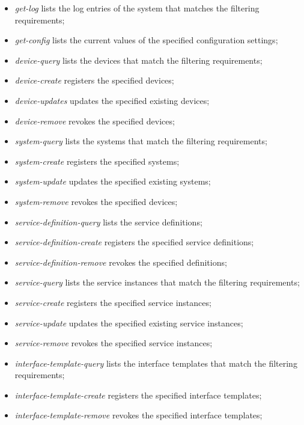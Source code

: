 \documentclass[a4paper]{arrowhead}
\begin{document}
\begin{itemize}
    \item \textit{get-log} lists the log entries of the system that matches the filtering requirements;
    \item \textit{get-config} lists the current values of the specified configuration settings;
    \item \textit{device-query} lists the devices that match the filtering requirements;
    \item \textit{device-create} registers the specified devices;
    \item \textit{device-updates} updates the specified existing devices;
    \item \textit{device-remove} revokes the specified devices;
    \item \textit{system-query} lists the systems that match the filtering requirements;
    \item \textit{system-create} registers the specified systems;
    \item \textit{system-update} updates the specified existing systems;
    \item \textit{system-remove} revokes the specified devices;
    \item \textit{service-definition-query} lists the service definitions;
    \item \textit{service-definition-create} registers the specified service definitions;
    \item \textit{service-definition-remove} revokes the specified definitions;
    \item \textit{service-query} lists the service instances that match the filtering requirements;
    \item \textit{service-create} registers the specified service instances;
    \item \textit{service-update} updates the specified existing service instances;
    \item \textit{service-remove} revokes the specified service instances;
    \item \textit{interface-template-query} lists the interface templates that match the filtering requirements;
    \item \textit{interface-template-create} registers the specified interface templates;
    \item \textit{interface-template-remove} revokes the specified interface templates;
    
\end{itemize}
\end{document}

